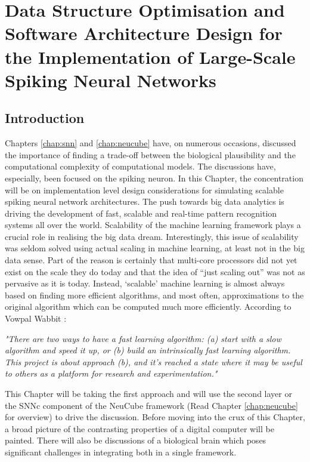 \chapter{Data Structure Optimisation and Software Architecture Design for the Implementation of Large-Scale Spiking Neural Networks}
\label{chap:large_snn}
\section{Introduction}
Chapters \ref{chap:snn} and \ref{chap:neucube} have, on numerous occasions, discussed the importance of finding a trade-off between the biological plausibility and the computational complexity of computational models. The discussions have, especially, been focused on the spiking neuron. In this Chapter, the concentration will be on implementation level design considerations for simulating scalable spiking neural network architectures. The push towards big data analytics is driving the development of fast, scalable and real-time pattern recognition systems all over the world. Scalability of the machine learning framework plays a crucial role in realising the big data dream. Interestingly, this issue of scalability was seldom solved using actual scaling in machine learning, at least not in the big data sense. Part of the reason is certainly that multi-core processors did not yet exist on the scale they do today and that the idea of “just scaling out” was not as pervasive as it is today. Instead, `scalable' machine learning is almost always based on finding more efficient algorithms, and most often, approximations to the original algorithm which can be computed much more efficiently. According to Vowpal Wabbit \citep{langford2007vowpal}:

\emph{"There are two ways to have a fast learning algorithm: (a) start with a slow algorithm and speed it up, or (b) build an intrinsically fast learning algorithm. This project is about approach (b), and it’s reached a state where it may be useful to others as a platform for research and experimentation."}

This Chapter will be taking the first approach and will use the second layer or the SNNc component of the NeuCube framework (Read Chapter \ref{chap:neucube} for overview) to drive the discussion. Before moving into the crux of this Chapter, a broad picture of the contrasting properties of a digital computer will be painted. There will also be discussions of a biological brain which poses significant challenges in integrating both in a single framework.
